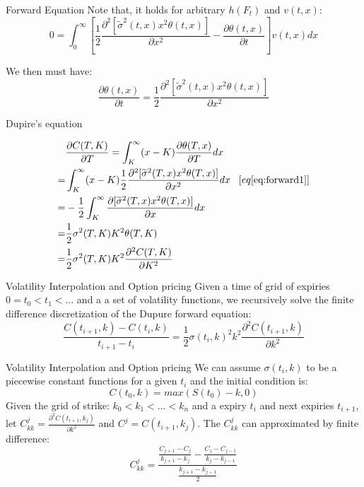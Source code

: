 \documentclass[10pt,table,mathserif]{beamer}
\begin{document}
\begin{frame}{Forward Equation}
Note that, it holds for arbitrary $h(F_t)$ and $v(t,x)$:
\[
0=\int_{0}^{\infty} [\frac{1}{2} \frac{\partial^2 [\widetilde{\sigma}^2(t,x) x^2  \theta(t,x)]}{\partial x^2} -\frac{\partial \theta(t,x)}{\partial t}] v(t,x)dx
\]

We then must have:
\begin{equation}
\frac{\partial \theta(t,x)}{\partial t}=\frac{1}{2} \frac{\partial^2 [\widetilde{\sigma}^2(t,x) x^2  \theta(t,x)]}{\partial x^2}   \label{eq:forward1}
\end{equation}
\end{frame}



\begin{frame}{Dupire’s equation}

\[\begin{split}
&\frac{\partial C(T,K)}{\partial T}=\int_{K}^{\infty} (x-K) \frac{\partial \theta(T,x)}{\partial T} dx\\
= &\int_{K}^{\infty} (x-K) \frac{1}{2} \frac{\partial^2 [\widetilde{\sigma}^2(T,x) x^2  \theta(T,x)]}{\partial x^2} dx\;\;\;  [eq \eqref{eq:forward1}] \\
=& -\frac{1}{2} \int_{K}^{\infty}  \frac{\partial [\widetilde{\sigma}^2(T,x) x^2  \theta(T,x)]}{\partial x} dx\\
=&\frac{1}{2} {\sigma}^2(T,K)K^2  \theta(T,K)\\
=&\frac{1}{2} {\sigma}^2(T,K)K^2  \frac{\partial^2 C(T,K)}{ \partial K^2}
\end{split}
\]
\end{frame}

\begin{frame}{Volatility Interpolation and Option pricing}
Given a time of grid of expiries $0=t_0 < t_1 < \dots $ and a a set of volatility functions, we recursively solve the finite difference  discretization of the Dupure forward equation:
\begin{equation}
\frac{C(t_{i+1},k) -C(t_{i},k)}{t_{i+1}-t_{i}}=\frac{1}{2}\sigma(t_i,k)^2 k^2 \frac{\partial^2 C(t_{i+1},k) }  {\partial k^2} 
\label{eq:dupire}
\end{equation}
\end{frame}
\begin{frame}{Volatility Interpolation and Option pricing}
We can assume $\sigma(t_i,k)$  to be a piecewise constant functions for a given $t_i$ and the initial condition is:
\[C(t_0,k)=max(S(t_0)-k,0)\]
Given the grid of strike: $k_0<k_1<\dots<k_n$ and a expiry $t_i$ and next expiries $t_{i+1}$, let $C_{kk}^j=\frac{\partial^2 C(t_{i+1},k_j) }{\partial k^2}$ and  $C^{j}=  C(t_{i+1},k_j)$. The $C_{kk}^j$ can approximated by finite difference:
\[
C_{kk}^j=\frac{
	\frac{C_{j+1}-C_{j}}{k_{j+1}-k_{j}}-\frac{C_{j}-C_{j-1}}{k_{j}-k_{j-1}}
}{\frac{k_{j+1}-k_{j-1}}{2}}
\]
\end{frame}
\end{document}
